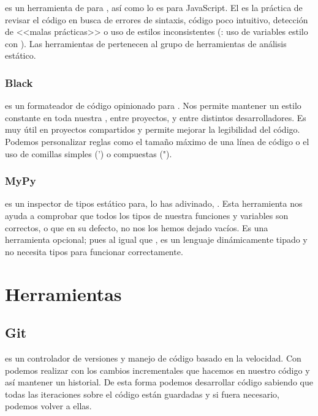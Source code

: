  es un herramienta de  para , así como  lo es para JavaScript. El  es la práctica de revisar el código en busca de errores de sintaxis, código poco intuitivo, detección de <<malas prácticas>> o uso de estilos inconsistentes (\pe: uso de variables estilo  con ). Las herramientas de  pertenecen al grupo de herramientas de análisis estático.

\subsubsection{Black}

 es un formateador de código opinionado para . Nos permite mantener un estilo constante en toda nuestra , entre proyectos, y entre distintos desarrolladores. Es muy útil en proyectos compartidos y permite mejorar la legibilidad del código. Podemos personalizar reglas como el tamaño máximo de una línea de código o el uso de comillas simples (') o compuestas (").

\subsubsection{MyPy}

 es un inspector de tipos estático para, lo has adivinado, . Esta herramienta nos ayuda a comprobar que todos los tipos de nuestra funciones y variables son correctos, o que en su defecto, no nos los hemos dejado vacíos. Es una herramienta opcional; pues al igual que ,  es un lenguaje dinámicamente tipado y no necesita tipos para funcionar correctamente.


\section{Herramientas}

\subsection{Git}

 es un controlador de versiones y manejo de código basado en la velocidad. Con  podemos realizar  con los cambios incrementales que hacemos en nuestro código y así mantener un historial. De esta forma podemos desarrollar código sabiendo que todas las iteraciones sobre el código están guardadas y si fuera necesario, podemos volver a ellas.

